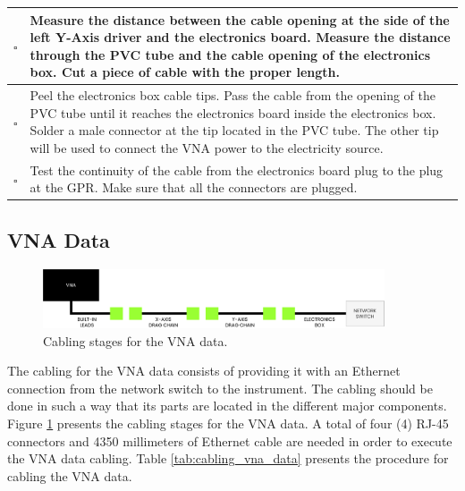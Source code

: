 \documentclass{article}
\begin{document}
\begin{singlespace}
\begin{xltabular}{\textwidth}{|c|X|}
    $\square$ & Measure the distance between the cable opening at the side of the left Y-Axis driver and the electronics board. Measure the distance through the PVC tube and the cable opening of the electronics box. Cut a piece of cable with the proper length. \\ \hline
    $\square$ & Peel the  electronics box cable tips. Pass the cable from the opening of the PVC tube until it reaches the electronics board inside the electronics box. Solder a male connector at the tip located in the PVC tube. The other tip will be used to connect the VNA power to the electricity source. \\ \hline
    $\square$ & Test the continuity of the cable from the electronics board plug to the plug at the GPR. Make sure that all the connectors are plugged. \\ \hline 
\end{xltabular}
\end{singlespace}

\subsection{VNA Data}
\begin{figure}[H]
    \centering
    \includegraphics[width=0.9\textwidth]{images/cabling/vna_data_cabling.pdf}
    \caption{Cabling stages for the VNA data.}
    \label{fig:cabling_vna_data}
\end{figure}
The cabling for the VNA data consists of providing it with an Ethernet connection from the network switch to the instrument. The cabling should be done in such a way that its parts are located in the different major components. Figure \ref{fig:cabling_vna_data} presents the cabling stages for the VNA data. A total of four (4) RJ-45 connectors and 4350 millimeters of Ethernet cable are needed in order to execute the VNA data cabling. Table \ref{tab:cabling_vna_data} presents the procedure for cabling the VNA data.
\end{document}
